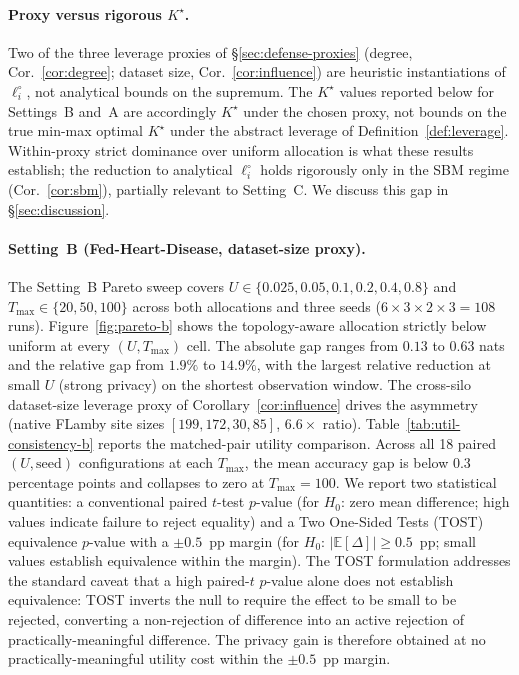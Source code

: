 \documentclass[letterpaper,journal]{IEEEtran}
\newcommand{\Tmax}{T_{\max}}
\begin{document}
\paragraph{Proxy versus rigorous $K^\star$.}
Two of the three leverage proxies of \S\ref{sec:defense-proxies}
(degree, Cor.~\ref{cor:degree}; dataset size,
Cor.~\ref{cor:influence}) are heuristic instantiations of
$\ell_i^\circ$, not analytical bounds on the supremum. The $K^\star$
values reported below for Settings~B and~A are accordingly $K^\star$
under the chosen proxy, not bounds on the true min-max optimal
$K^\star$ under the abstract leverage of
Definition~\ref{def:leverage}. Within-proxy strict dominance over
uniform allocation is what these results establish; the reduction to
analytical $\ell_i^\circ$ holds rigorously only in the SBM regime
(Cor.~\ref{cor:sbm}), partially relevant to Setting~C. We discuss this
gap in \S\ref{sec:discussion}.

\paragraph{Setting~B (Fed-Heart-Disease, dataset-size proxy).}
The Setting~B Pareto sweep covers
$U \in \{0.025, 0.05, 0.1, 0.2, 0.4, 0.8\}$ and
$\Tmax \in \{20, 50, 100\}$ across both allocations and three seeds
($6 \times 3 \times 2 \times 3 = 108$ runs).
Figure~\ref{fig:pareto-b} shows the topology-aware allocation strictly
below uniform at every $(U, \Tmax)$ cell. The absolute gap ranges from $0.13$ to $0.63$ nats
and the relative gap from $1.9\%$ to $14.9\%$, with the largest
relative reduction at small $U$ (strong privacy) on the shortest
observation window. The cross-silo dataset-size leverage proxy of
Corollary~\ref{cor:influence} drives the asymmetry (native FLamby site
sizes $[199, 172, 30, 85]$, $6.6\times$ ratio).
Table~\ref{tab:util-consistency-b} reports the matched-pair utility
comparison. Across all 18 paired $(U, \text{seed})$ configurations at
each $\Tmax$, the mean accuracy gap is below $0.3$ percentage points
and collapses to zero at $\Tmax = 100$. We report two statistical
quantities: a conventional paired $t$-test $p$-value (for $H_0$: zero
mean difference; high values indicate failure to reject equality) and
a Two One-Sided Tests (TOST) equivalence $p$-value with a
$\pm 0.5$~pp margin (for $H_0$: $|\mathbb{E}[\Delta]|\ge 0.5$~pp;
small values establish equivalence within the margin). The TOST
formulation addresses the standard caveat that a high paired-$t$
$p$-value alone does not establish equivalence: TOST inverts the null
to require the effect to be small to be rejected, converting a
non-rejection of difference into an active rejection of
practically-meaningful difference. The privacy gain is therefore
obtained at no practically-meaningful utility cost within the
$\pm 0.5$~pp margin.
\end{document}
